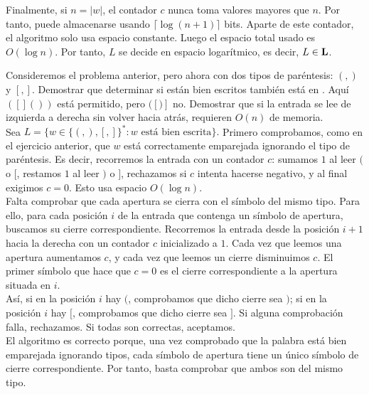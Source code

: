 \begin{ejercicio}
    Finalmente, si $n=|w|$, el contador $c$ nunca toma valores mayores que $n$. Por tanto, puede almacenarse usando $\lceil \log(n+1)\rceil$
    bits. Aparte de este contador, el algoritmo solo usa espacio constante. Luego el espacio total usado es $O(\log n)$.
    Por tanto, $L$ se decide en espacio logarítmico, es decir, $L\in \textbf{L}$.
\end{ejercicio}



\begin{ejercicio}
    Consideremos el problema anterior, pero ahora con dos tipos de 
    paréntesis: $(,)$ y $[,]$. Demostrar que determinar si están bien 
    escritos también está en \Loga. Aquí $([]())$ está permitido, pero 
    $([)]$ no. Demostrar que si la entrada se lee de izquierda a derecha 
    sin volver hacia atrás, requieren $O(n)$ de memoria. \\

    Sea $L=\{w\in\{(,),[,]\}^{*} : w \text{ está bien escrita}\}.$
    Primero comprobamos, como en el ejercicio anterior, que $w$ está correctamente emparejada ignorando el tipo de paréntesis. 
    Es decir, recorremos la entrada con un contador $c$: sumamos $1$ al leer $($ o $[$, restamos $1$ al leer $)$ o $]$, rechazamos si 
    $c$ intenta hacerse negativo, y al final exigimos $c=0$. Esto usa espacio $O(\log n)$. \\

    Falta comprobar que cada apertura se cierra con el símbolo del mismo tipo. Para ello, para cada posición $i$ de la entrada que contenga un símbolo de apertura, 
    buscamos su cierre correspondiente. Recorremos la entrada desde la posición $i+1$ hacia la derecha con un contador $c$ inicializado a $1$. Cada vez que leemos una 
    apertura aumentamos $c$, y cada vez que leemos un cierre disminuimos $c$. El primer símbolo que hace que $c=0$ es el cierre correspondiente a la apertura situada en $i$. \\
    
    Así, si en la posición $i$ hay $($, comprobamos que dicho cierre sea $)$; si en la posición $i$ hay $[$, comprobamos que dicho cierre sea $]$. 
    Si alguna comprobación falla, rechazamos. Si todas son correctas, aceptamos. \\

    El algoritmo es correcto porque, una vez comprobado que la palabra está bien emparejada ignorando tipos, cada símbolo de apertura tiene un único símbolo de cierre correspondiente. Por tanto, basta comprobar que ambos son del mismo tipo.


\end{ejercicio}
